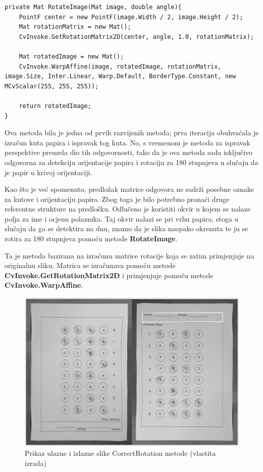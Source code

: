 \documentclass{foi}
\begin{document}
\pagebreak
\begin{lstlisting}[caption={Metoda za rotaciju slike}]
private Mat RotateImage(Mat image, double angle){
    PointF center = new PointF(image.Width / 2, image.Height / 2);
    Mat rotationMatrix = new Mat();
    CvInvoke.GetRotationMatrix2D(center, angle, 1.0, rotationMatrix);

    Mat rotatedImage = new Mat();
    CvInvoke.WarpAffine(image, rotatedImage, rotationMatrix, image.Size, Inter.Linear, Warp.Default, BorderType.Constant, new MCvScalar(255, 255, 255));

    return rotatedImage;
}
\end{lstlisting}

Ova metoda bila je jedna od prvih razvijenih metoda; prva iteracija obuhvaćala je izračun kuta papira i ispravak tog kuta. No, s vremenom je metoda za ispravak perspektive preuzela dio tih odgovornosti, tako da je ova metoda sada isključivo odgovorna za detekciju orijentacije papira i rotaciju za 180 stupnjeva u slučaju da je papir u krivoj orijentaciji.

Kao što je već spomenuto, predložak matrice odgovora ne sadrži posebne oznake za kutove i orijentaciju papira. Zbog toga je bilo potrebno pronaći druge referentne strukture na predlošku. Odlučeno je koristiti okvir u kojem se nalaze polja za ime i ocjenu polaznika. Taj okvir nalazi se pri vrhu papira, stoga u slučaju da ga se detektira na dnu, znamo da je slika naopako okrenuta te ju se rotira za 180 stupnjeva pomoću metode \textbf{RotateImage}.

Ta je metoda bazirana na izračunu matrice rotacije koja se zatim primjenjuje na originalnu sliku. Matrica se izračunava pomoću metode \textbf{CvInvoke.GetRotationMatrix2D} i primjenjuje pomoću metode \textbf{CvInvoke.WarpAffine}.

\begin{figure}[H]
\centering
\includegraphics[width=0.7\linewidth]{slike/RotationComparison.png}
\caption{Prikaz ulazne i izlazne slike CorrectRotation metode (vlastita izrada)}
\end{figure}
\end{document}
